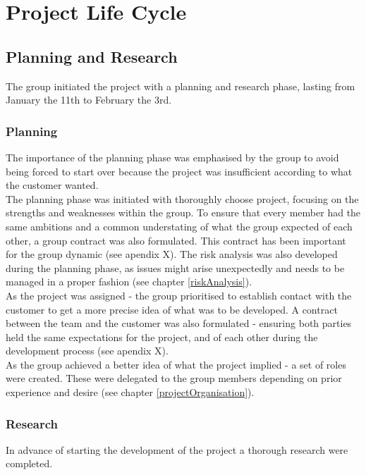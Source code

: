 
\chapter{Project Life Cycle}

\section{Planning and Research}
The group initiated the project with a planning and research phase, lasting from January the 11th to February the 3rd. 

\subsection{Planning}
The importance of the planning phase was emphasised by the group to avoid being forced to start over because the project was insufficient according to what the customer wanted. \\

The planning phase was initiated with thoroughly choose project, focusing on the strengths and weaknesses within the group. To ensure that every member had the same ambitions and a common understating of what the group expected of each other, a group contract was also formulated. This contract has been important for the group dynamic (see apendix X). The risk analysis was also developed during the planning phase, as issues might arise unexpectedly and needs to be managed in a proper fashion (see chapter \ref{riskAnalysis}).  \\  

As the project was assigned - the group prioritised to establish contact with the customer to get a more precise idea of what was to be developed. A contract between the team and the customer was also formulated - ensuring both parties held the same expectations for the project, and of each other during the development process (see apendix X).\\

As the group achieved a better idea of what the project implied - a set of roles were created. These were delegated to the group members depending on prior experience and desire (see chapter \ref{projectOrganisation}).

\subsection{Research}
In advance of starting the development of the project a thorough research were completed.

